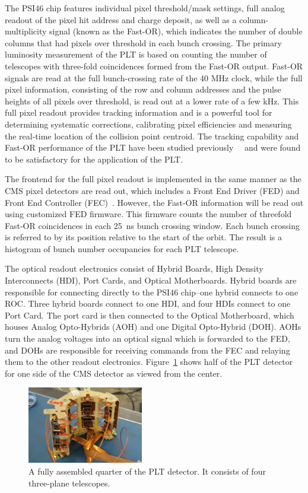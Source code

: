 \documentclass[journal]{IEEEtran}
\begin{document}
The PSI46 chip features individual pixel threshold/mask settings, full analog readout of the pixel hit address and charge deposit, as well as a column-multiplicity signal (known as the Fast-OR), which indicates the number of double columns that had pixels over threshold in each bunch crossing. 
The primary luminosity measurement of the PLT is based on counting the number of telescopes with three-fold coincidences formed from the Fast-OR output.  Fast-OR signals are read at the full bunch-crossing rate of the 40 MHz clock, while the full pixel
information, consisting of the row and column addresses and the pulse heights of all pixels over threshold,
is read out at a lower rate of a few kHz. This full pixel readout provides tracking information and
is a powerful tool for determining systematic corrections, calibrating pixel efficiencies and measuring
the real-time location of the collision point centroid.  The tracking capability and Fast-OR performance of the PLT  have been studied previously~\cite{pixel-2010}~\cite{ieee2010} and were found to be satisfactory for the application of the PLT.

The frontend for the full pixel readout is implemented in the same manner as the CMS pixel detectors are read out, which includes a Front End Driver (FED) and Front End Controller  (FEC)~\cite{control-readout}.  However, the Fast-OR information will be read out using customized FED firmware.  This firmware counts the number of threefold Fast-OR coincidences in each 25~ns bunch crossing window.  Each bunch crossing is referred to by its position relative to the start of the orbit. The result is a histogram of bunch number occupancies for each PLT telescope.   

The optical readout electronics consist of Hybrid Boards,  High Density Interconnects (HDI), Port Cards, and Optical Motherboards.  Hybrid boards are responsible for connecting directly to the PSI46 chip--one hybrid connects to one ROC.  Three hybrid boards connect to one HDI, and four HDIs connect to one Port Card.  The port card is then connected to the Optical Motherboard, which houses Analog Opto-Hybrids (AOH) and one Digital Opto-Hybrid (DOH).  AOHs turn the analog voltages into an optical signal which is forwarded to the FED, and DOHs are responsible for receiving commands from the FEC and relaying them to the other readout electronics.  Figure~\ref{fig:plt_cassette} shows half of the PLT detector for one side of the CMS detector as viewed from the center.

\begin{figure}[!h]
\centering
\includegraphics[width=0.45\textwidth]{plt_cassette}
\caption{ A fully assembled quarter of the PLT detector.  It consists of four three-plane telescopes.  }
\label{fig:plt_cassette}
\end{figure}
\end{document}
